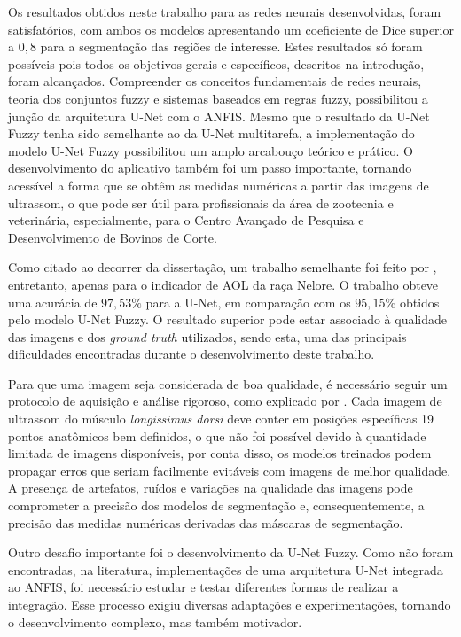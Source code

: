 Os resultados obtidos neste trabalho para as redes neurais desenvolvidas, foram satisfatórios, com ambos os modelos apresentando um coeficiente de Dice superior a $0,8$ para a segmentação das regiões de interesse. Estes resultados só foram possíveis pois todos os objetivos gerais e específicos, descritos na introdução, foram alcançados. Compreender os conceitos fundamentais de redes neurais, teoria dos conjuntos fuzzy e sistemas baseados em regras fuzzy, possibilitou a junção da arquitetura U-Net com o ANFIS. Mesmo que o resultado da U-Net Fuzzy tenha sido semelhante ao da U-Net multitarefa, a implementação do modelo U-Net Fuzzy possibilitou um amplo arcabouço teórico e prático. O desenvolvimento do aplicativo também foi um passo importante, tornando acessível a forma que se obtêm as medidas numéricas a partir das imagens de ultrassom, o que pode ser útil para profissionais da área de zootecnia e veterinária, especialmente, para o Centro Avançado de Pesquisa e Desenvolvimento de Bovinos de Corte.

Como citado ao decorrer da dissertação, um trabalho semelhante foi feito por \cite{JadersonMelo2022UNetpp}, entretanto, apenas para o indicador de AOL da raça Nelore. O trabalho obteve uma acurácia de $97,53\%$ para a U-Net, em comparação com os $95,15\%$ obtidos pelo modelo U-Net Fuzzy. O resultado superior pode estar associado à qualidade das imagens e dos \textit{ground truth} utilizados, sendo esta, uma das principais dificuldades encontradas durante o desenvolvimento deste trabalho. 

Para que uma imagem seja considerada de boa qualidade, é necessário seguir um protocolo de aquisição e análise rigoroso, como explicado por \cite{Mercadante2010}. Cada imagem de ultrassom do músculo \textit{longissimus dorsi} deve conter em posições específicas 19 pontos anatômicos bem definidos, o que não foi possível devido à quantidade limitada de imagens disponíveis, por conta disso, os modelos treinados podem propagar erros que seriam facilmente evitáveis com imagens de melhor qualidade. A presença de artefatos, ruídos e variações na qualidade das imagens pode comprometer a precisão dos modelos de segmentação e, consequentemente, a precisão das medidas numéricas derivadas das máscaras de segmentação. 

Outro desafio importante foi o desenvolvimento da U-Net Fuzzy. Como não foram encontradas, na literatura, implementações de uma arquitetura U-Net integrada ao ANFIS, foi necessário estudar e testar diferentes formas de realizar a integração. Esse processo exigiu diversas adaptações e experimentações, tornando o desenvolvimento complexo, mas também motivador.

